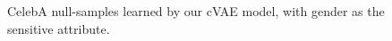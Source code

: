 \begin{figure}[tb]
{      %
      \label{fig:cvae_celeba_recon_s}
  }
  \caption{
    CelebA null-samples learned by our cVAE model, with gender as the sensitive attribute.
}
\end{figure}

